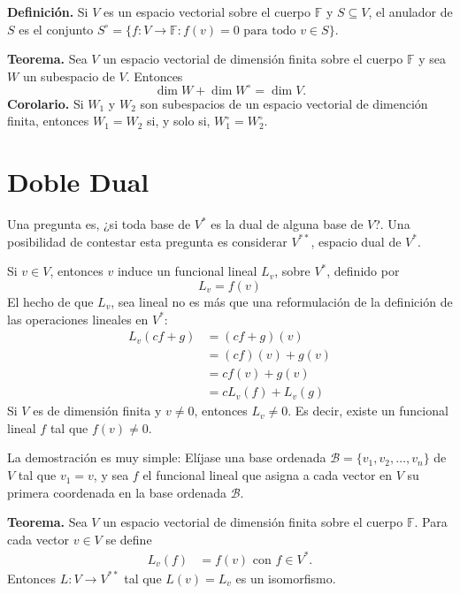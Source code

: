 \newpage

\textbf{Definición.} Si $V$ es un espacio vectorial sobre el
cuerpo $\mathbb{F}$ y $S\subseteq V$, el anulador
de $S$ es el conjunto $S^{\circ}=\{f:V\to\mathbb{F}: f(v) = 0
\text{ para todo }v\in S\}$.

\textbf{Teorema.} Sea $V$ un espacio vectorial de dimensión
finita sobre el cuerpo $\mathbb{F}$ y sea $W$ un subespacio
de $V$. Entonces $$\dim W + \dim W^{\circ} = \dim V.$$
\textbf{Corolario.} Si $W_1$ y $W_2$ son subespacios de un
espacio vectorial de dimención finita, entonces $W_1 = W_2$
si, y solo si, $W_1^{\circ} = W_2^{\circ}$.

\section{Doble Dual}

Una pregunta es, ¿si toda base
de $V^{\ast}$ es la dual de alguna base de $V$?.
Una posibilidad de contestar esta pregunta es considerar
$V^{\ast\ast}$, espacio dual de $V^{\ast}$.

Si $v\in V$, entonces $v$ induce un funcional lineal $L_{v}$,
sobre $V^{\ast}$, deﬁnido por
$$L_{v}=f(v)$$
El hecho de que $L_{v}$, sea lineal no es más que una
reformulación de la deﬁnición de las operaciones lineales
en $V^{\ast}$:
\begin{align*}
    L_v(cf + g) &= (cf + g)(v)\\
                &= (cf)(v) + g(v)\\
                &= cf(v) + g(v)\\
                &= cL_v(f) + L_v(g)
\end{align*}
Si $V$ es de dimensión finita y $v \not = 0$, entonces
$L_v \not = 0$. Es decir, existe un funcional
lineal $f$ tal que $f(v) \not = 0$.

La demostración es muy simple: Elíjase una base ordenada
$\mathcal{B} = \{v_1, v_2, \dots, v_n\}$ de $V$ tal que
$v_1 = v $, y sea $f$ el funcional lineal que asigna a cada
vector en $V$ su primera coordenada en la base ordenada 
$\mathcal{B}$.

\textbf{Teorema.} Sea $V$ un espacio vectorial de dimensión
finita sobre el cuerpo $\mathbb{F}$. Para cada vector $v\in V$
se define
\begin{align*}
    L_v(f) &= f(v)\text{ con $f\in V^{\ast}$}.
\end{align*}
Entonces $L:V\to V^{\ast\ast}$ tal que $L(v)=L_v$
es un isomorfismo.
